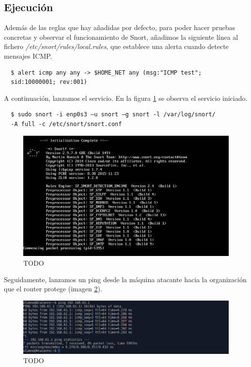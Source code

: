 \documentclass[a4,12pt,onecolum]{article}
\begin{document}
\subsection{Ejecución}

Además de las reglas que hay añadidas por defecto, para poder hacer pruebas concretas y observar el funcionamiento de Snort, añadimos la siguiente línea al fichero \emph{/etc/snort/rules/local.rules}, que establece una alerta cuando detecte mensajes ICMP.

\begin{verbatim}
  $ alert icmp any any -> $HOME_NET any (msg:"ICMP test";
  sid:10000001; rev:001)
\end{verbatim}

A continuación, lanzamos el servicio. En la figura \ref{fig:snort2} se observa el servicio iniciado. \\

\begin{verbatim}
  $ sudo snort -i enp0s3 –u snort –g snort -l /var/log/snort/
  -A full -c /etc/snort/snort.conf
\end{verbatim}

\begin{figure}[htbp]
\centering
\includegraphics[width=1.0\textwidth]{./images/SnortInicio.png}
\caption{TODO}
\label{fig:snort2}
\end{figure}

Seguidamente, lanzamos un ping desde la máquina atacante hacia la organización que el router protege (imagen \ref{fig:snort3}).

\begin{figure}[htbp]
\centering
\includegraphics[width=1.0\textwidth]{./images/SnortPing.png}
\caption{TODO}
\label{fig:snort3}
\end{figure}
\end{document}
